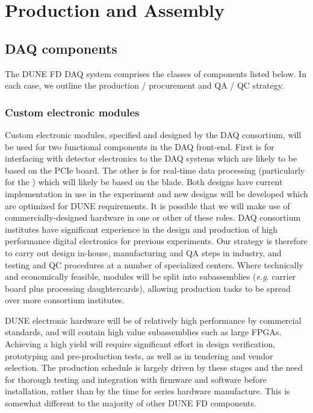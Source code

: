
\section{Production and Assembly}
\label{sec:fd-daq-prod-assy}

\subsection{DAQ components}

The DUNE FD DAQ system comprises the classes of components listed below. In each case, we outline the production / procurement and QA / QC strategy.

\subsubsection{Custom electronic modules}


Custom electronic modules, specified and designed by the DAQ
consortium, will be used for two functional components in the DAQ
front-end. 
First is for interfacing with detector electronics to the DAQ
 systems which are likely to be based on the 
PCIe board.
The other is for real-time data processing (particularly for the
 ) which will likely be based on the
  blade.
Both designs have current implementation in use in the 
experiment and new designs will be developed which are optimized for
DUNE requirements.
It is possible that we will make use of commercially-designed hardware
in one or other of these roles. DAQ consortium institutes have
significant experience in the design and production of high
performance digital electronics for previous experiments.
Our strategy is therefore to carry out design in-house, manufacturing
and QA steps in industry, and testing and QC procedures at a number of
specialized centers.
Where technically and economically feasible, modules will be split
into subassemblies ({\it e.g.} carrier board plus processing
daughtercards), allowing production tasks to be spread over more
consortium institutes.

DUNE electronic hardware will be of relatively high performance by commercial standards, and will contain high value subassemblies such as large FPGAs. Achieving a high yield will require significant effort in design verification, prototyping and pre-production tests, as well as in tendering and vendor selection. The production schedule is largely driven by these stages and the need for thorough testing and integration with firmware and software before installation, rather than by the time for series hardware manufacture. This is somewhat different to the majority of other DUNE FD components.

